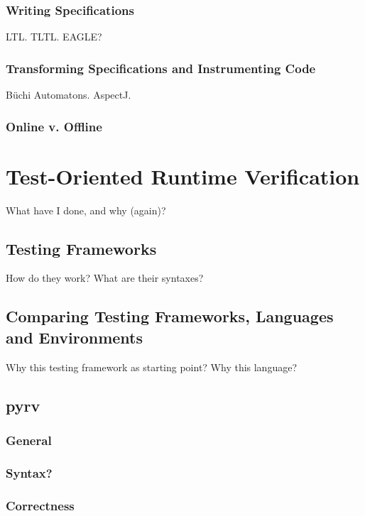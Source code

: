 \documentclass[a4paper,11pt]{kth-mag}
\begin{document}
\subsection{Writing Specifications}

LTL. TLTL. EAGLE?

\subsection{Transforming Specifications and Instrumenting Code}

B\"uchi Automatons.
AspectJ.

\subsection{Online v. Offline}

\pagestyle{newchap}
\chapter{Test-Oriented Runtime Verification}

What have I done, and why (again)?

\section{Testing Frameworks}

How do they work? What are their syntaxes?

\section{Comparing Testing Frameworks, Languages and Environments}

Why this testing framework as starting point? Why this language?

\section{pyrv}

\subsection{General}

\subsection{Syntax?}

\subsection{Correctness}
\end{document}
